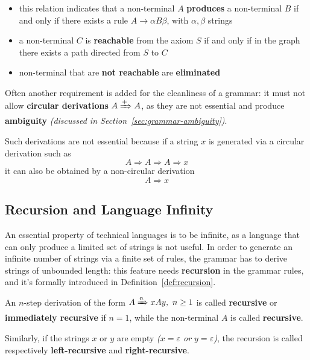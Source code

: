 \documentclass[english]{article}
\begin{document}
\begin{enumerate}[label=step \arabic*., ref=(step \arabic*), labelindent=2em, leftmargin=*, widest=7]
        \begin{itemize}
          \item this relation indicates that a non-terminal \(A\) \textbf{produces} a non-terminal \(B\) if and only if there exists a rule \(A \rightarrow \alpha B \beta\), with \(\alpha, \beta\) strings
          \item a non-terminal \(C\) is \textbf{reachable} from the axiom \(S\) if and only if in the graph there exists a path directed from \(S\) to \(C\)
          \item non-terminal that are \textbf{not reachable} are \textbf{eliminated}
        \end{itemize}
\end{enumerate}

\bigskip
Often another requirement is added for the cleanliness of a grammar: it must not allow \textbf{circular derivations} \(A \xRightarrow{+} A\), as they are not essential and produce \textbf{ambiguity} \textit{(discussed in Section~\ref{sec:grammar-ambiguity})}.

Such derivations are not essential because if a string \(x\) is generated via a circular derivation such as
\[ A \Rightarrow A \Rightarrow A \Rightarrow x \]
it can also be obtained by a non-circular derivation
\[ A \Rightarrow x \]

\subsection{Recursion and Language Infinity}

An essential property of technical languages is to be infinite, as a language that can only produce a limited set of strings is not useful.
In order to generate an infinite number of strings via a finite set of rules, the grammar has to derive strings of unbounded length:
this feature needs \textbf{recursion} in the grammar rules, and it's formally introduced in Definition~\ref{def:recursion}.

\begin{definition}[Recursion]
  \label{def:recursion}
  An \(n\)-step derivation of the form \(A \xRightarrow{n} x A y, \ n \geq 1\) is called \textbf{recursive} or \textbf{immediately recursive} if \(n=1\), while the non-terminal \(A\) is called \textbf{recursive}.

  Similarly, if the strings \(x\) or \(y\) are empty \textit{(\(x=\varepsilon\) or \(y=\varepsilon\))}, the recursion is called respectively \textbf{left-recursive} and \textbf{right-recursive}.
\end{definition}
\end{document}
